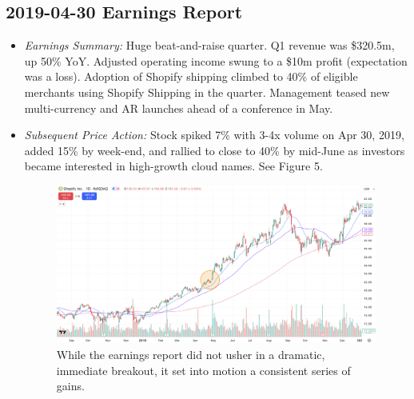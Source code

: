 \documentclass[11pt]{article}
\begin{document}
    \subsection{2019-04-30 Earnings Report} 
        \begin{itemize}
            \item \textit{Earnings Summary:} Huge beat-and-raise quarter. Q1 revenue was \$320.5m, up 50\% YoY. Adjusted operating income swung to a \$10m profit (expectation was a loss). Adoption of Shopify shipping climbed to 40\% of eligible merchants using Shopify Shipping in the quarter. Management teased new multi-currency and AR launches ahead of a conference in May.
            \item \textit{Subsequent Price Action:} Stock spiked 7\% with 3-4x volume on Apr 30, 2019, added 15\% by week-end, and rallied to close to 40\% by mid-June as investors became interested in high-growth cloud names. See Figure 5.
            \begin{figure}[h]
                \centering \includegraphics[width=0.8\linewidth]{images/SHOP1.png}
                \caption{While the earnings report did not usher in a dramatic, immediate breakout, it set into motion a consistent series of gains.}
            \end{figure}
        \end{itemize}
\end{document}
